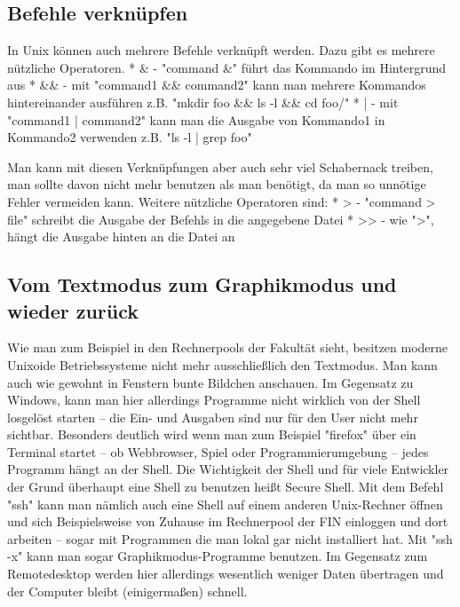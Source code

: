 \subsection{Befehle verknüpfen}
In Unix können auch mehrere Befehle verknüpft werden. Dazu gibt es mehrere nützliche Operatoren.
* \& - "command \&" führt das Kommando im Hintergrund aus
* \&\& - mit "command1 \&\& command2" kann man mehrere Kommandos hintereinander ausführen z.B. "mkdir foo \&\& ls -l \&\& cd foo/"
* | - mit "command1 | command2" kann man die Ausgabe von Kommando1 in Kommando2 verwenden  z.B. "ls -l | grep foo"

Man kann mit diesen Verknüpfungen aber auch sehr viel Schabernack treiben, man sollte davon nicht mehr benutzen als man benötigt, da man so unnötige Fehler vermeiden kann.
Weitere nützliche Operatoren sind:
* > - "command > file" schreibt die Ausgabe der Befehls in die angegebene Datei
* >> - wie ">", hängt die Ausgabe hinten an die Datei an

\subsection{Vom Textmodus zum Graphikmodus und wieder zurück}
Wie man zum Beispiel in den Rechnerpools der Fakultät sieht, besitzen moderne Unixoide Betriebssysteme nicht mehr ausschließlich den Textmodus. Man kann auch wie gewohnt in Fenstern bunte Bildchen anschauen.
Im Gegensatz zu Windows, kann man hier allerdings Programme nicht wirklich von der Shell losgelöst starten – die Ein- und Ausgaben sind nur für den User nicht mehr sichtbar. Besonders deutlich wird wenn man zum Beispiel "firefox" über ein Terminal startet – ob Webbrowser, Spiel oder Programmierumgebung – jedes Programm hängt an der Shell.
Die Wichtigkeit der Shell und für viele Entwickler der Grund überhaupt eine Shell zu benutzen heißt Secure Shell. Mit dem Befehl "ssh" kann man nämlich auch eine Shell auf einem anderen Unix-Rechner öffnen und sich Beispielsweise von Zuhause im Rechnerpool der FIN einloggen und dort arbeiten – sogar mit Programmen die man lokal gar nicht installiert hat. Mit "ssh -x" kann man sogar Graphikmodus-Programme benutzen.
Im Gegensatz zum Remotedesktop werden hier allerdings wesentlich weniger Daten übertragen und der Computer bleibt (einigermaßen) schnell.
